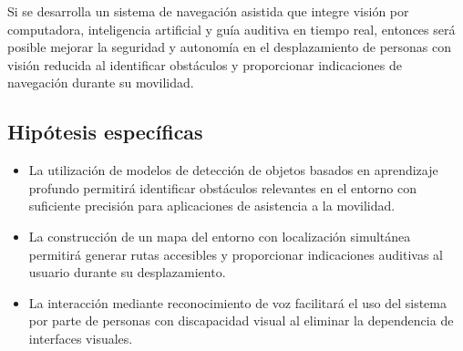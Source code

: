 Si se desarrolla un sistema de navegación asistida que integre visión por computadora, inteligencia artificial y guía auditiva en tiempo real, entonces será posible mejorar la seguridad y autonomía en el desplazamiento de personas con visión reducida al identificar obstáculos y proporcionar indicaciones de navegación durante su movilidad.

\subsection{Hipótesis específicas}
\begin{itemize}
    \item La utilización de modelos de detección de objetos basados en aprendizaje profundo permitirá identificar obstáculos relevantes en el entorno con suficiente precisión para aplicaciones de asistencia a la movilidad.

    \item La construcción de un mapa del entorno con localización simultánea permitirá generar rutas accesibles y proporcionar indicaciones auditivas al usuario durante su desplazamiento.

    \item La interacción mediante reconocimiento de voz facilitará el uso del sistema por parte de personas con discapacidad visual al eliminar la dependencia de interfaces visuales.
\end{itemize}